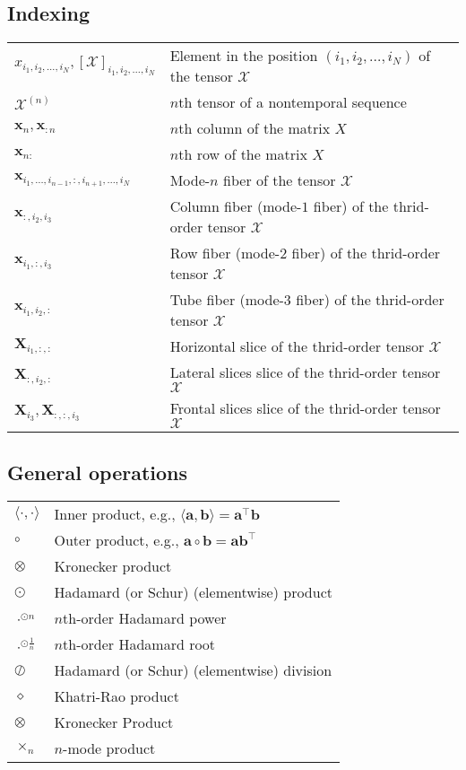 \documentclass{article}
\newcommand{\inner}[2]{\ensuremath{\langle#1,#2\rangle}} %
\begin{document}
\subsection{Indexing}
\begin{xltabular}[l]{\linewidth}{XX}
    \(x_{i_1,i_2, \dots, i_N}, \left[ \bm{\mathcal{X}} \right]_{i_1,i_2, \dots, i_N}\) & Element in the position \((i_1,i_2, \dots, i_N)\) of the tensor \(\bm{\mathcal{X}}\)\\
    \(\bm{\mathcal{X}}^{(n)}\) & \(n\)th tensor of a nontemporal sequence\\
    \(\mathbf{x}_{n}, \mathbf{x}_{:n}\) & \(n\)th column of the matrix \(X\)\\
    \(\mathbf{x}_{n:}\) & \(n\)th row of the matrix \(X\)\\
    \(\mathbf{x}_{i_1,\dots,i_{n-1}, :, i_{n+1},\dots, i_N}\) & Mode-\(n\) fiber of the tensor \(\bm{\mathcal{X}}\)\\
    \(\mathbf{x}_{:,i_2,i_3}\) & Column fiber (mode-\(1\) fiber) of the thrid-order tensor \(\bm{\mathcal{X}}\)\\
    \(\mathbf{x}_{i_1,:,i_3}\) & Row fiber (mode-\(2\) fiber) of the thrid-order tensor \(\bm{\mathcal{X}}\)\\
    \(\mathbf{x}_{i_1,i_2,:}\) & Tube fiber (mode-\(3\) fiber) of the thrid-order tensor \(\bm{\mathcal{X}}\)\\
    \(\mathbf{X}_{i_1,:,:}\) & Horizontal slice of the thrid-order tensor \(\bm{\mathcal{X}}\)\\
    \(\mathbf{X}_{:,i_2,:}\) & Lateral slices slice of the thrid-order tensor \(\bm{\mathcal{X}}\)\\
    \(\mathbf{X}_{i_3}, \mathbf{X}_{:,:,i_3}\) & Frontal slices slice of the thrid-order tensor \(\bm{\mathcal{X}}\)
\end{xltabular}

\subsection{General operations}
\begin{xltabular}{\textwidth}{XX}
    \(\inner{\cdot}{\cdot}\) & Inner product, e.g., \(\inner{\mathbf{a}}{\mathbf{b}} = \mathbf{a}^\top\mathbf{b}\)\\
    \(\circ\) & Outer product, e.g., \(\mathbf{a} \circ \mathbf{b} = \mathbf{a}\mathbf{b}^\top\)\\
    \(\otimes\) & Kronecker product\\
    \(\odot\) & Hadamard (or Schur) (elementwise) product\\
    \(\cdot^{\odot n}\) & \(n\)th-order Hadamard power\\
    \(\cdot^{\odot \frac{1}{n}}\) & \(n\)th-order Hadamard root\\
    \(\oslash\) & Hadamard (or Schur) (elementwise) division\\
    \(\diamond\) & Khatri-Rao product\\
    \(\otimes\) & Kronecker Product\\
    \(\times_n\) & \(n\)-mode product\\
\end{xltabular}
\end{document}
